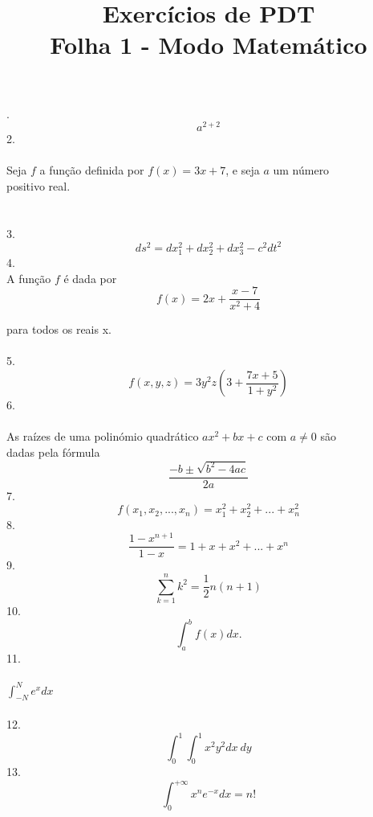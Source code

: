 \documentclass[12pt, fleqn]{article}
\title{Exercícios de PDT \\Folha 1 - Modo Matemático}
\date{}
\begin{document}
\maketitle

.
\[
a^{2+2}
\] 
2.
\\
\\ \indent Seja $f$ a funç\~ao definida por $f(x) = 3x+7$, e seja $a$ um número
\\ \indent positivo real.
\\
\\
\\3.
$$ds^2=dx_1^2+dx_2^2+dx_3^2-c^2dt^2$$
4.
\\

A funç\~ao $f$ é dada por 
$$f(x)=2x+\frac{x-7}{x^2+4}$$

para todos os reais x.
\\
\\5.
$$f(x,y,z)=3y^2z\left(3+\frac{7x+5}{1+y^2}\right)$$
6.
\\
\\ \indent As raízes de uma polinómio quadrático $ax^2 + bx + c$ com $a \neq 0$ s\~ao
\\ \indent dadas pela fórmula $$\frac{-b \pm \sqrt{b^2-4ac}}{2a}$$
7.
\[
f(x_1,x_2,...,x_n)=x_1^2+x_2^2+...+x_n^2
\]
8.$$\frac{1-x^{n+1}}{1-x}=1+x+x^2+...+x^n$$
9.$$\sum_{k=1}^{n}k^2=\frac{1}{2}n(n+1)$$
10.$$\int_{a}^{b}f(x)dx.$$
11.
\\
\\
$\int_{-N}^{N}e^xdx$
\\
\\
12.$$\int_{0}^{1}\int_{0}^{1}x^2y^2dx\  dy$$
13.$$\int_{0}^{+\infty}x^ne^{-x}dx=n!$$
\end{document}
